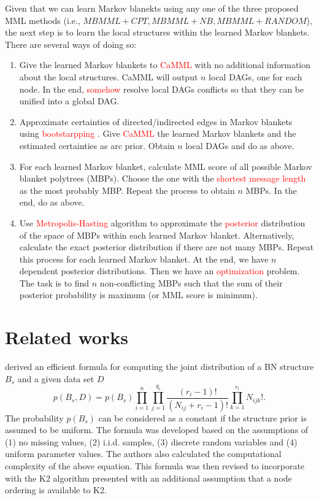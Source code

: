 Given that we can learn Markov blanekts using any one of the three proposed MML methods (i.e., $MBMML+CPT, MBMML+NB, MBMML+RANDOM$), the next step is to learn the local structures within the learned Markov blankets. There are several ways of doing so: 
\begin{enumerate}[label=(\alph*)]
\item Give the learned Markov blankets to \textcolor{red}{CaMML} with no additional information about the local structures. CaMML will output $n$ local DAGs, one for each node. In the end, \textcolor{red}{somehow} resolve local DAGs conflicts so that they can be unified into a global DAG.
\item Approximate certainties of directed/indirected edges in Markov blankets using \textcolor{red}{bootstarpping} \cite{friedman1999application}. Give \textcolor{red}{CaMML} the learned Markov blankets and the estimated certainties as arc prior. Obtain $n$ local DAGs and do as above. 
\item For each learned Markov blanket, calculate MML score of all possible Markov blanket polytrees (MBPs). Choose the one with the \textcolor{red}{shortest message length} as the most probably MBP. Repeat the process to obtain $n$ MBPs. In the end, do as above. 
\item Use \textcolor{red}{Metropolis-Hasting} algorithm to approximate the \textcolor{red}{posterior} distribution of the space of MBPs within each learned Markov blanket. Alternatively, calculate the exact posterior distribution if there are not many MBPs. Repeat this process for each learned Markov blanket. At the end, we have $n$ dependent posterior distributions. Then we have an \textcolor{red}{optimization} problem. The task is to find $n$ non-conflicting MBPs such that the sum of their posterior probability is maximum (or MML score is minimum). 
\end{enumerate}

\section{Related works}
\cite{cooper1992} derived an efficient formula for computing the joint distribution of a BN structure $B_s$ and a given data set $D$
\begin{equation}
p(B_s, D) = p(B_s) \prod_{i=1}^n \prod_{j=1}^{q_i} \frac{(r_i-1)!}{(N_{ij}+r_i-1)!}\prod_{k=1}^{r_i} N_{ijk}!.
\end{equation}
The probability $p(B_s)$ can be considered as a constant if the structure prior is assumed to be uniform. The formula was developed based on the assumptions of (1) no missing values, (2) i.i.d. samples, (3) discrete random variables and (4) uniform parameter values. The authors also calculated the computational complexity of the above equation. This formula was then revised to incorporate with the K2 algorithm presented with an additional assumption that a node ordering is available to K2.  

